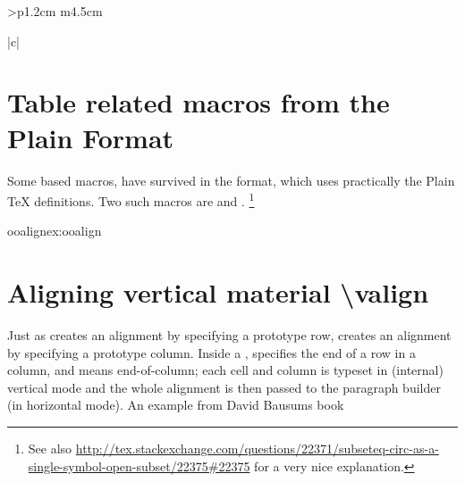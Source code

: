 \begin{tabular}{>{\bfseries}p{1.2cm} m{4.5cm}}
\begin{tabular}[t]{|c|}
\begin{longtable}
\section{Table related macros from the Plain Format}

Some  based macros, have survived in the \latexe format, which uses practically the Plain TeX definitions. Two such macros are  and . \footnote{See also \protect\url{http://tex.stackexchange.com/questions/22371/subseteq-circ-as-a-single-symbol-open-subset/22375\#22375} for a very nice explanation.}

\begin{texexample}{ooalign}{ex:ooalign}
\end{texexample}




\section{Aligning vertical material \textbackslash valign}


Just as \cmd{\halign} creates an alignment by specifying a prototype row,  creates an alignment by specifying a prototype column. Inside a \cmd{\valign}, \cmd{\textand} specifies the end of a row in a column, and \cmd{\cr} means end-of-column; each cell and column is typeset in (internal) vertical mode and the whole alignment is then passed to the paragraph builder (in horizontal mode).  An example from David Bausums book

\medskip



\begin{teXXX}
\bye
\end{teXXX}
\bigskip

\topline

\bottomline


\end{longtable}
\end{tabular}
\end{tabular}
